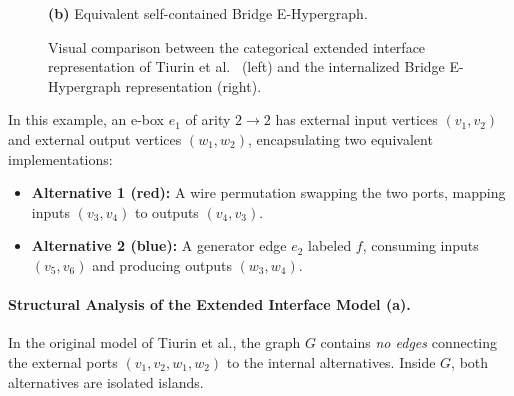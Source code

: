 \documentclass[11pt,a4paper]{article}
\theoremstyle{definition}
\theoremstyle{plain}
\begin{document}
\begin{figure}[htbp]
\begin{minipage}[t]{0.48\textwidth}
\par\vspace{0.4em}
\textbf{(b)} Equivalent self-contained Bridge E-Hypergraph.
\end{minipage}
\caption{Visual comparison between the categorical extended interface representation of Tiurin et al.~\cite{tiurin2024equivalence} (left) and the internalized Bridge E-Hypergraph representation (right).}
\label{fig:comparison-example}
\end{figure}

In this example, an e-box $e_1$ of arity $2 \to 2$ has external input vertices $(v_1, v_2)$ and external output vertices $(w_1, w_2)$, encapsulating two equivalent implementations:
\begin{itemize}
    \item \textbf{Alternative 1 (red):} A wire permutation swapping the two ports, mapping inputs $(v_3, v_4)$ to outputs $(v_4, v_3)$.
    \item \textbf{Alternative 2 (blue):} A generator edge $e_2$ labeled $f$, consuming inputs $(v_5, v_6)$ and producing outputs $(w_3, w_4)$.
\end{itemize}

\paragraph{Structural Analysis of the Extended Interface Model (a).}
In the original model of Tiurin et al., the graph $G$ contains \emph{no edges} connecting the external ports $(v_1, v_2, w_1, w_2)$ to the internal alternatives. Inside $G$, both alternatives are isolated islands. 
\end{document}
